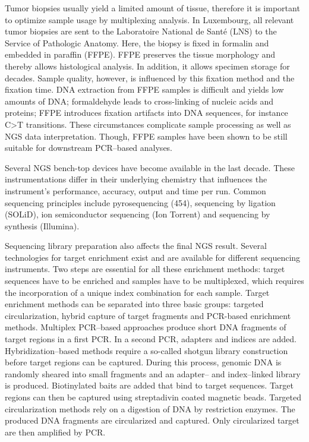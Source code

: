 {{      Tumor biopsies usually yield a limited amount of tissue, therefore it is
      important to optimize sample usage by multiplexing analysis. In
      Luxembourg, all relevant tumor biopsies are sent to the
      Laboratoire National de Santé (LNS) to the Service of Pathologic Anatomy.
      Here, the biopsy is fixed in formalin and embedded in paraffin (FFPE).
      FFPE preserves the tissue morphology and thereby allows histological
      analysis. In addition, it allows specimen storage for decades. Sample
      quality, however, is influenced by this fixation method and the fixation
      time. DNA extraction from FFPE samples is difficult and yields low amounts
      of DNA; formaldehyde leads to cross-linking of nucleic acids and proteins;
      FFPE introduces fixation artifacts into DNA sequences, for instance C>T
      transitions. These circumstances complicate sample processing as well as
      NGS data interpretation. Though, FFPE samples have been shown to be still
      suitable for downstream PCR--based analyses.

      Several NGS bench-top devices have become available in the last decade.
      These instrumentations differ in their underlying chemistry that
      influences the instrument’s performance, accuracy, output and time per
      run. Common sequencing principles include pyrosequencing (454), sequencing
      by ligation (SOLiD), ion semiconductor sequencing (Ion Torrent) and
      sequencing by synthesis (Illumina).

      Sequencing library preparation also affects the final NGS result. Several
      technologies for target enrichment exist and are available for different
      sequencing instruments. Two steps are essential for all these enrichment
      methods: target sequences have to be enriched and samples have to be
      multiplexed, which requires the incorporation of a unique index
      combination for each sample. Target enrichment methods can be separated
      into three basic groups: targeted circularization, hybrid capture of
      target fragments and PCR-based enrichment methods. Multiplex PCR--based
      approaches produce short DNA fragments of target regions in a first PCR.
      In a second PCR, adapters and indices are added. Hybridization--based
      methods require a so-called shotgun library construction before target
      regions can be captured. During this process, genomic DNA is randomly
      sheared into small fragments and an adapter-- and index--linked library is
      produced. Biotinylated baits are added that bind to target sequences.
      Target regions can then be captured using streptadivin coated magnetic
      beads. Targeted circularization methods rely on a digestion of DNA by
      restriction enzymes. The produced DNA fragments are circularized and
      captured. Only circularized target are then amplified by PCR.

}}

